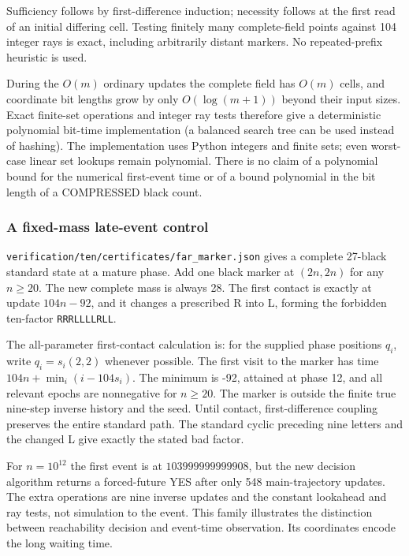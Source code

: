 \documentclass[
  11pt,
]{article}
\begin{document}
Sufficiency follows by first-difference induction; necessity follows at
the first read of an initial differing cell. Testing finitely many
complete-field points against 104 integer rays is exact, including
arbitrarily distant markers. No repeated-prefix heuristic is used.

During the \(O(m)\) ordinary updates the complete field has \(O(m)\)
cells, and coordinate bit lengths grow by only \(O(\log(m+1))\) beyond
their input sizes. Exact finite-set operations and integer ray tests
therefore give a deterministic polynomial bit-time implementation (a
balanced search tree can be used instead of hashing). The implementation
uses Python integers and finite sets; even worst-case linear set lookups
remain polynomial. There is no claim of a polynomial bound for the
numerical first-event time or of a bound polynomial in the bit length of
a COMPRESSED black count.

\subsubsection{A fixed-mass late-event
control}\label{a-fixed-mass-late-event-control}

\texttt{verification/ten/certificates/far\_marker.json} gives a complete
27-black standard state at a mature phase. Add one black marker at
\((2n,2n)\) for any \(n\ge20\). The new complete mass is always 28. The
first contact is exactly at update \(104n-92\), and it changes a
prescribed R into L, forming the forbidden ten-factor
\texttt{RRRLLLLRLL}.

The all-parameter first-contact calculation is: for the supplied phase
positions \(q_i\), write \(q_i=s_i(2,2)\) whenever possible. The first
visit to the marker has time \(104n+\min_i(i-104s_i)\). The minimum is
-92, attained at phase 12, and all relevant epochs are nonnegative for
\(n\ge20\). The marker is outside the finite true nine-step inverse
history and the seed. Until contact, first-difference coupling preserves
the entire standard path. The standard cyclic preceding nine letters and
the changed L give exactly the stated bad factor.

For \(n=10^{12}\) the first event is at \(103999999999908\), but the new
decision algorithm returns a forced-future YES after only 548
main-trajectory updates. The extra operations are nine inverse updates
and the constant lookahead and ray tests, not simulation to the event.
This family illustrates the distinction between reachability decision
and event-time observation. Its coordinates encode the long waiting time.
\end{document}
